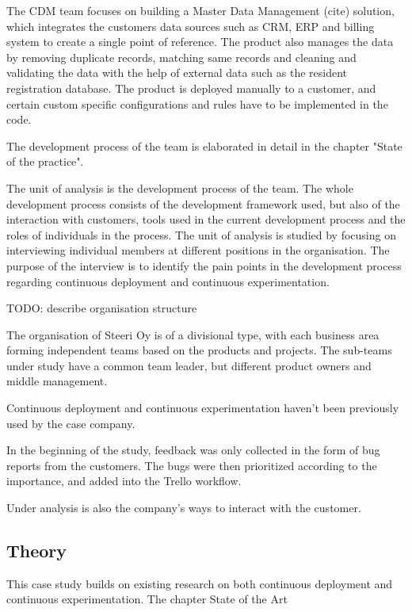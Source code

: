 \documentclass[english]{tktltiki2}
\theoremstyle{definition}
\theoremstyle{remark}
\begin{document}
The CDM team focuses on building a Master Data Management (cite) solution, which integrates the customers data sources such as CRM, ERP and billing system to create a single point of reference. The product also manages the data by removing duplicate records, matching same records and cleaning and validating the data with the help of external data such as the resident registration database. The product is deployed manually to a customer, and certain custom specific configurations and rules have to be implemented in the code. 

The development process of the team is elaborated in detail in the chapter "State of the practice". 

The unit of analysis is the development process of the team. The whole development process consists of the development framework used, but also of the interaction with customers, tools used in the current development process and the roles of individuals in the process. The unit of analysis is studied by focusing on interviewing individual members at different positions in the organisation. The purpose of the interview is to identify the pain points in the development process regarding continuous deployment and continuous experimentation. 

TODO: describe organisation structure %

The organisation of Steeri Oy is of a divisional type, with each business area forming independent teams based on the products and projects. The sub-teams under study have a common team leader, but different product owners and middle management. 

Continuous deployment and continuous experimentation haven't been previously used by the case company.  

In the beginning of the study, feedback was only collected in the form of bug reports from the customers. The bugs were then prioritized according to the importance, and added into the Trello workflow. 

Under analysis is also the company's ways to interact with the customer.

\subsection{Theory} %

This case study builds on existing research on both continuous deployment and continuous experimentation. The chapter State of the Art 
\end{document}
